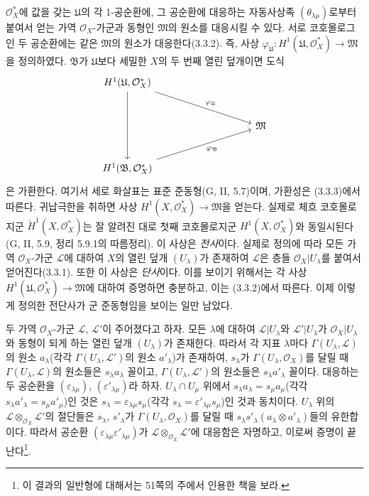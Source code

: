 \begin{env}[5.4.7]
$\mathcal O_X^*$에 값을 갖는 $\mathfrak U$의 각 1-공순환에, 그
공순환에 대응하는 자동사상족 $(\theta_{\lambda\mu})$로부터 붙여서
얻는 가역 $\mathcal O_X$-가군과 동형인 $\mathfrak M$의 원소를
대응시킬 수 있다. 서로 코호몰로그인 두 공순환에는 같은
$\mathfrak M$의 원소가 대응한다(3.3.2). 즉, 사상
$\varphi_{\mathfrak U}:H^1(\mathfrak U,\mathcal O_X^*)\to\mathfrak M$을
정의하였다. $\mathfrak B$가 $\mathfrak U$보다 세밀한 $X$의 두 번째
열린 덮개이면 도식
\[
\begin{tikzcd}[column sep=huge,row sep=large]
H^1(\mathfrak U,\mathcal O_X^*)
  \arrow[dd]
  \arrow[rrd,"\varphi_{\mathfrak U}"] & & \\
& & \mathfrak M \\
H^1(\mathfrak B,\mathcal O_X^*)
  \arrow[rru,swap,"\varphi_{\mathfrak B}"] & &
\end{tikzcd}
\]
은 가환한다. 여기서 세로 화살표는 표준 준동형(G, II, 5.7)이며,
가환성은 (3.3.3)에서 따른다. 귀납극한을 취하면 사상
$H^1(X,\mathcal O_X^*)\to\mathfrak M$을 얻는다. 실제로 체흐
코호몰로지군 $\check H^1(X,\mathcal O_X^*)$는 잘 알려진 대로 첫째
코호몰로지군 $H^1(X,\mathcal O_X^*)$와 동일시된다(G, II, 5.9,
정리 5.9.1의 따름정리). 이 사상은 \emph{전사}이다. 실제로 정의에
따라 모든 가역 $\mathcal O_X$-가군 $\mathcal L$에 대하여 $X$의 열린
덮개 $(U_\lambda)$가 존재하여 $\mathcal L$은 층들
$\mathcal O_X|U_\lambda$를 붙여서 얻어진다(3.3.1). 또한 이 사상은
\emph{단사}이다. 이를 보이기 위해서는 각 사상
$H^1(\mathfrak U,\mathcal O_X^*)\to\mathfrak M$에 대하여 증명하면
충분하고, 이는 (3.3.2)에서 따른다. 이제 이렇게 정의한 전단사가
군 준동형임을 보이는 일만 남았다.


두 가역 $\mathcal O_X$-가군 $\mathcal L$, $\mathcal L'$이 주어졌다고
하자. 모든 $\lambda$에 대하여 $\mathcal L|U_\lambda$와
$\mathcal L'|U_\lambda$가 $\mathcal O_X|U_\lambda$와 동형이 되게 하는
열린 덮개 $(U_\lambda)$가 존재한다. 따라서 각 지표 $\lambda$마다
$\Gamma(U_\lambda,\mathcal L)$의 원소 $a_\lambda$(각각
$\Gamma(U_\lambda,\mathcal L')$의 원소 $a'_\lambda$)가 존재하여,
$s_\lambda$가 $\Gamma(U_\lambda,\mathcal O_X)$를 달릴 때
$\Gamma(U_\lambda,\mathcal L)$의 원소들은
$s_\lambda a_\lambda$ 꼴이고, $\Gamma(U_\lambda,\mathcal L')$의
원소들은 $s_\lambda a'_\lambda$ 꼴이다. 대응하는 두 공순환을
$(\varepsilon_{\lambda\mu})$, $(\varepsilon'_{\lambda\mu})$라 하자.
$U_\lambda\cap U_\mu$ 위에서
$s_\lambda a_\lambda=s_\mu a_\mu$(각각
$s_\lambda a'_\lambda=s_\mu a'_\mu$)인 것은
$s_\lambda=\varepsilon_{\lambda\mu}s_\mu$(각각
$s_\lambda=\varepsilon'_{\lambda\mu}s_\mu$)인 것과 동치이다.
$U_\lambda$ 위의
$\mathcal L\otimes_{\mathcal O_X}\mathcal L'$의 절단들은
$s_\lambda$, $s'_\lambda$가 $\Gamma(U_\lambda,\mathcal O_X)$를 달릴
때 $s_\lambda s'_\lambda(a_\lambda\otimes a'_\lambda)$들의 유한합이다.
따라서 공순환
$(\varepsilon_{\lambda\mu}\varepsilon'_{\lambda\mu})$가
$\mathcal L\otimes_{\mathcal O_X}\mathcal L'$에 대응함은 자명하고,
이로써 증명이 끝난다\footnote{이 결과의 일반형에 대해서는 51쪽의
주에서 인용한 책을 보라.}.
\end{env}

